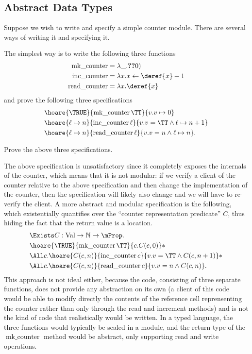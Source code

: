 \subsection{Abstract Data Types}
\label{sec:abstract-data-types}
Suppose we wish to write and specify a simple counter module.
There are several ways of writing it and specifying it.

The simplest way is to write the following three functions
\begin{align*}
  \operatorname{mk\_counter} &= \lambda \_ . \Ref(0)\\
  \operatorname{inc\_counter} &= \lambda x . x \gets \deref{x} + 1\\
  \operatorname{read\_counter} &= \lambda x . \deref{x}
\end{align*}
and prove the following three specifications
\begin{align*}
  &\hoare{\TRUE}{\operatorname{mk\_counter} \TT}{v. v \pointsto 0}\\
  &\hoare{\ell \pointsto n}{\operatorname{inc\_counter} \ell}{v. v = \TT \land \ell \pointsto n + 1}\\
  &\hoare{\ell \pointsto n}{\operatorname{read\_counter} \ell}{v. v = n \land \ell \pointsto n}.
\end{align*}
\begin{exercise}
  Prove the above three specifications.
\end{exercise}


The above specification is unsatisfactory since it completely exposes
the internals of the counter, which means that it is not modular: if
we verify a client of the counter relative to the above specification
and then change the implementation of the counter, then the
specification will likely also change and we will have to re-verify
the client.  A more abstract and modular specification is the
following, which existentially quantifies over the ``counter
representation predicate'' $C$, thus hiding the fact that the return
value is a location.
\begin{align}
  \label{eq:counter-example:specification-style-we-use}
  \begin{split}
    &\Exists C : \Val \to \NN \to \Prop.\\
    &\hoare{\TRUE}{\operatorname{mk\_counter} \TT}{c. C(c, 0)} \ast \\
    &\All c . \hoare{C(c, n)}{\operatorname{inc\_counter} c}{v. v = \TT \land C(c, n + 1)} \ast\\
    &\All c . \hoare{C(c, n)}{\operatorname{read\_counter} c}{v. v = n \land C(c, n)}.
  \end{split}
\end{align}
This approach is not ideal either, because the code, consisting of
three separate functions, does not provide any abstraction on its own
(a client of this code would be able to modify directly the contents of the
reference cell reprensenting the 
counter rather than only through the read and increment methods)
and is not the kind of code that realistically would be written.  In a
typed language, the three functions would typically be sealed in a module,
and the return type of the $\operatorname{mk\_counter}$
method would be abstract, only supporting read and write operations.


